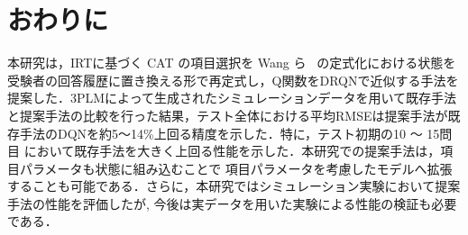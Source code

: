\documentclass[dvipdfmx,a4j]{jarticle}
\begin{document}


\section{おわりに}

本研究は，IRTに基づく CAT の項目選択を Wang ら~\cite{wang2024} の定式化における状態を受験者の回答履歴に置き換える形で再定式し，Q関数をDRQNで近似する手法を提案した．3PLMによって生成されたシミュレーションデータを用いて既存手法と提案手法の比較を行った結果，テスト全体における平均RMSEは提案手法が既存手法のDQNを約5〜14\%上回る精度を示した．特に，テスト初期の10 〜 15問目 において既存手法を大きく上回る性能を示した．本研究での提案手法は，項目パラメータも状態に組み込むことで 項目パラメータを考慮したモデルへ拡張することも可能である．さらに，本研究ではシミュレーション実験において提案手法の性能を評価したが, 今後は実データを用いた実験による性能の検証も必要である．





\end{document}
